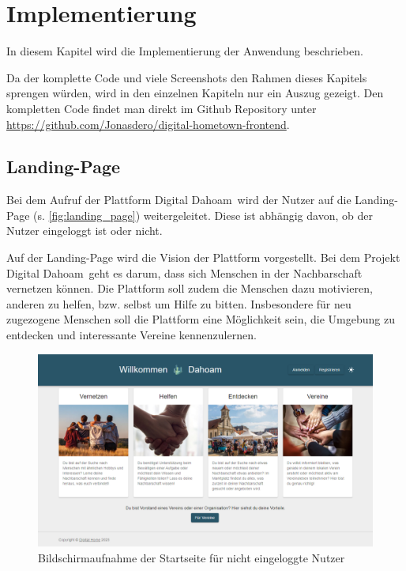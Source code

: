 \chapter{Implementierung}
\label{ch:implementation}

In diesem Kapitel wird die Implementierung der Anwendung beschrieben.

Da der komplette Code und viele Screenshots den Rahmen dieses Kapitels sprengen würden, wird in den einzelnen Kapiteln nur ein Auszug gezeigt.
Den kompletten Code findet man direkt im Github Repository unter \url{https://github.com/Jonasdero/digital-hometown-frontend}.


\section{Landing-Page}
\label{sec:landing_page}

Bei dem Aufruf der Plattform \glqq Digital Dahoam\grqq \ wird der Nutzer auf die Landing-Page (s. \autoref{fig:landing_page}) weitergeleitet. Diese ist abhängig davon, ob der Nutzer eingeloggt ist oder nicht.

Auf der Landing-Page wird die Vision der Plattform vorgestellt. Bei dem Projekt \glqq Digital Dahoam\grqq \ geht es darum, dass sich Menschen in der Nachbarschaft vernetzen können. Die Plattform soll zudem die Menschen dazu motivieren, anderen zu helfen, bzw. selbst um Hilfe zu bitten. Insbesondere für neu zugezogene Menschen soll die Plattform eine Möglichkeit sein, die Umgebung zu entdecken und interessante Vereine kennenzulernen.

\begin{figure}[!htb]
    \centering
    \includegraphics[width=.9\textwidth]{figures/boas/21_landing_page.png}
    \caption[]{Bildschirmaufnahme der Startseite für nicht eingeloggte Nutzer}
    \label{fig:landing_page}
\end{figure}


